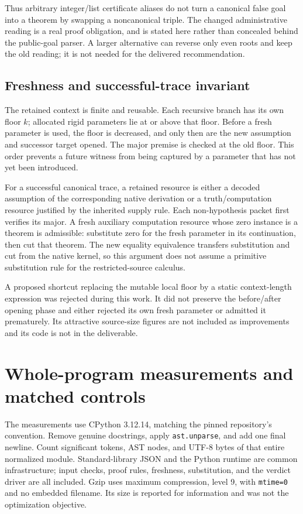 \documentclass[11pt,letterpaper]{article}
\theoremstyle{definition}\newtheorem{definition}[theorem]{Definition}
\theoremstyle{remark}\newtheorem{remark}[theorem]{Remark}
\newcommand{\code}[1]{{\small\nolinkurl{#1}}}
\begin{document}
Thus arbitrary integer/list certificate aliases do not turn a canonical
false goal into a theorem by swapping a noncanonical triple. The changed
administrative reading is a real proof obligation, and is stated here
rather than concealed behind the public-goal parser. A larger alternative
can reverse only even roots and keep the old reading; it is not needed
for the delivered recommendation.

\subsection{Freshness and successful-trace invariant}

The retained context is finite and reusable. Each recursive branch has
its own floor $k$; allocated rigid parameters lie at or above that floor.
Before a fresh parameter is used, the floor is decreased, and only then
are the new assumption and successor target opened. The major premise
is checked at the old floor. This order prevents a future witness from
being captured by a parameter that has not yet been introduced.

For a successful canonical trace, a retained resource is either a decoded
assumption of the corresponding native derivation or a truth/computation
resource justified by the inherited supply rule. Each non-hypothesis
packet first verifies its major. A fresh auxiliary computation resource
whose zero instance is a theorem is admissible: substitute zero for the
fresh parameter in its continuation, then cut that theorem. The new
equality equivalence transfers substitution and cut from the native
kernel, so this argument does not assume a primitive substitution rule
for the restricted-source calculus.

A proposed shortcut replacing the mutable local floor by a static
context-length expression was rejected during this work. It did not
preserve the before/after opening phase and either rejected its own
fresh parameter or admitted it prematurely. Its attractive source-size
figures are not included as improvements and its code is not in the
deliverable.

\section{Whole-program measurements and matched controls}
\label{sec:measurements}

The measurements use CPython 3.12.14, matching the pinned repository's
convention. Remove genuine docstrings, apply \code{ast.unparse}, and add
one final newline. Count significant tokens, AST nodes, and UTF-8 bytes
of that entire normalized module. Standard-library JSON and the Python
runtime are common infrastructure; input checks, proof rules, freshness,
substitution, and the verdict driver are all included. Gzip uses maximum
compression, level 9, with \code{mtime=0} and no embedded filename. Its
size is reported for information and was not the optimization objective.
\end{document}
